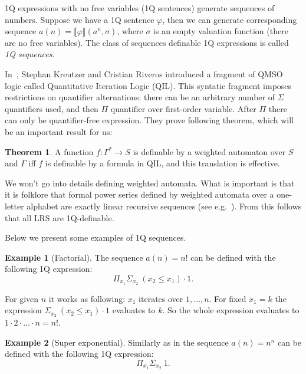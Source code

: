 \documentclass[12pt]{article}
\theoremstyle{definition}
\newtheorem{theorem}{Theorem}[section]
\newtheorem{example}{Example}[section]
\begin{document}
1Q expressions with no free variables (1Q sentences) generate sequences of numbers. Suppose we have a 1Q sentence $\varphi$, then we can generate corresponding sequence $a(n) = \llbracket \varphi \rrbracket (a^n, \sigma)$, where $\sigma$ is an empty valuation function (there are no free variables). The class of sequences definable 1Q expressions is called \emph{1Q sequences}.

In~\cite[Section IV]{KreutzerR13}, Stephan Kreutzer and Cristian Riveros introduced a fragment of QMSO logic called Quantitative Iteration Logic (QIL). This syntatic fragment imposes restrictions on quantifier alternations: there can be an arbitrary number of $\Sigma$ quantifiers used, and then $\Pi$ quantifier over first-order variable. After $\Pi$ there can only be quantifier-free expression. They prove following theorem, which will be an important result for us:

\begin{theorem}
\label{QILWL}
    A function $f: \Gamma^* \rightarrow S$ is definable by a weighted automaton over $S$ and $\Gamma$ iff $f$ is definable by a formula in QIL, and this translation is effective.
\end{theorem}

We won't go into details defining weighted automata. What is important is that it is folklore that formal power series defined by weighted automata over a one-letter alphabet are exactly linear recursive sequences (see e.g.~\cite{BarloyFLM22}). From this follows that all LRS are 1Q-definable.

Below we present some examples of 1Q sequences.

\begin{example}[Factorial]
\label{ExSeqFactorial}
    The sequence $a(n) = n!$ can be defined with the following 1Q expression: 
    $$\Pi_{x_1}\Sigma_{x_2} \ (x_2 \leq x_1) \cdot 1.$$

    For given $n$ it works as following: $x_1$ iterates over $1,\ldots,n$. For fixed $x_1 = k$ the expression $\Sigma_{x_2} \ (x_2 \leq x_1) \cdot 1$ evaluates to $k$. So the whole expression evaluates to $1 \cdot 2 \cdot \ldots \cdot n = n!$.
\end{example}

\begin{example}[Super exponential]
\label{ExSeqNToN}
    Similarly as in  the sequence $a(n) = n^n$ can be defined with the following 1Q expression:
    $$\Pi_{x_1}\Sigma_{x_2} \ 1.$$
\end{example}
\end{document}
